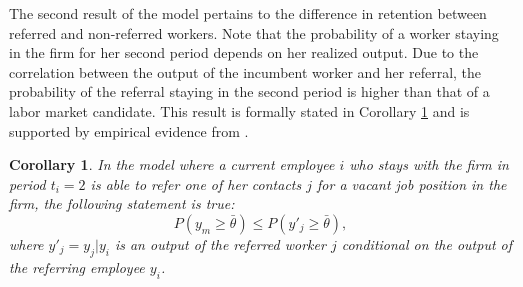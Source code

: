 \documentclass[12pt]{article}
\newtheorem{corollary}[theorem]{Corollary}
\begin{document}
The second result of the model pertains to the difference in retention between referred and non-referred workers. Note that the probability of a worker staying in the firm for her second period depends on her realized output. Due to the correlation between the output of the incumbent worker and her referral, the probability of the referral staying in the second period is higher than that of a labor market candidate. This result is formally stated in Corollary \ref{cor:retention_vr} and is supported by empirical evidence from \cite{simon1992matchmaker, coverdill1998fit, petersen2000offering, kugler2003employee, heath2018firms}.
\begin{corollary}\label{cor:retention_vr}
    In the model where a current employee $i$ who stays with the firm in period $t_i = 2$ is able to refer one of her contacts $j$ for a vacant job position in the firm, the following statement is true:
    \begin{equation}
        P(y_m \geq \bar{\theta}) \leq P(y'_j \geq \bar{\theta}),
    \end{equation}
    where $y'_j = y_j | y_i$ is an output of the referred worker $j$ conditional on the output of the referring employee $y_i$.
\end{corollary}
\end{document}
